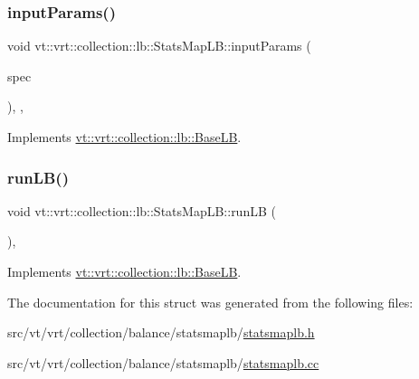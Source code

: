 \mbox{\label{structvt_1_1vrt_1_1collection_1_1lb_1_1_stats_map_l_b_a495d91782f11c1bb5d1774a05b2a73f6}} 
\subsubsection{\texorpdfstring{input\+Params()}{inputParams()}}
{\footnotesize\ttfamily void vt\+::vrt\+::collection\+::lb\+::\+Stats\+Map\+L\+B\+::input\+Params (\begin{DoxyParamCaption}\item[{\hyperlink{structvt_1_1vrt_1_1collection_1_1balance_1_1_spec_entry}{balance\+::\+Spec\+Entry} $\ast$}]{spec }\end{DoxyParamCaption})\hspace{0.3cm}{\ttfamily [inline]}, {\ttfamily [override]}, {\ttfamily [virtual]}}



Implements \hyperlink{structvt_1_1vrt_1_1collection_1_1lb_1_1_base_l_b_a555e29aadfd428383464d6dd007506b6}{vt\+::vrt\+::collection\+::lb\+::\+Base\+LB}.

\mbox{\label{structvt_1_1vrt_1_1collection_1_1lb_1_1_stats_map_l_b_a20a7bd354dcaca4393c66034be3b4083}} 
\subsubsection{\texorpdfstring{run\+L\+B()}{runLB()}}
{\footnotesize\ttfamily void vt\+::vrt\+::collection\+::lb\+::\+Stats\+Map\+L\+B\+::run\+LB (\begin{DoxyParamCaption}{ }\end{DoxyParamCaption})\hspace{0.3cm}{\ttfamily [override]}, {\ttfamily [virtual]}}



Implements \hyperlink{structvt_1_1vrt_1_1collection_1_1lb_1_1_base_l_b_a69a398c54f8129f365171a1189ffcd84}{vt\+::vrt\+::collection\+::lb\+::\+Base\+LB}.



The documentation for this struct was generated from the following files\+:\begin{DoxyCompactItemize}
\item 
src/vt/vrt/collection/balance/statsmaplb/\hyperlink{statsmaplb_8h}{statsmaplb.\+h}\item 
src/vt/vrt/collection/balance/statsmaplb/\hyperlink{statsmaplb_8cc}{statsmaplb.\+cc}\end{DoxyCompactItemize}

